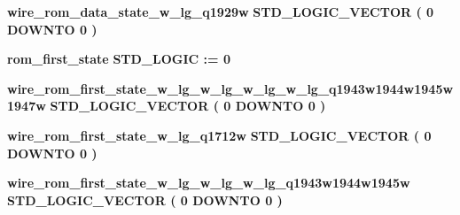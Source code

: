 \begin{DoxyCompactItemize}
\item 
{\bf wire\+\_\+rom\+\_\+data\+\_\+state\+\_\+w\+\_\+lg\+\_\+q1929w} {\bfseries \textcolor{comment}{S\+T\+D\+\_\+\+L\+O\+G\+I\+C\+\_\+\+V\+E\+C\+T\+OR}\textcolor{vhdlchar}{ }\textcolor{vhdlchar}{(}\textcolor{vhdlchar}{ }\textcolor{vhdlchar}{ } \textcolor{vhdldigit}{0} \textcolor{vhdlchar}{ }\textcolor{keywordflow}{D\+O\+W\+N\+TO}\textcolor{vhdlchar}{ }\textcolor{vhdlchar}{ } \textcolor{vhdldigit}{0} \textcolor{vhdlchar}{ }\textcolor{vhdlchar}{)}\textcolor{vhdlchar}{ }} 
\item 
{\bf rom\+\_\+first\+\_\+state} {\bfseries \textcolor{comment}{S\+T\+D\+\_\+\+L\+O\+G\+IC}\textcolor{vhdlchar}{ }\textcolor{vhdlchar}{ }\textcolor{vhdlchar}{\+:}\textcolor{vhdlchar}{=}\textcolor{vhdlchar}{ }\textcolor{vhdlchar}{ }\textcolor{vhdlchar}{\textquotesingle{}}\textcolor{vhdlchar}{ } \textcolor{vhdldigit}{0} \textcolor{vhdlchar}{ }\textcolor{vhdlchar}{\textquotesingle{}}\textcolor{vhdlchar}{ }} 
\item 
{\bf wire\+\_\+rom\+\_\+first\+\_\+state\+\_\+w\+\_\+lg\+\_\+w\+\_\+lg\+\_\+w\+\_\+lg\+\_\+w\+\_\+lg\+\_\+q1943w1944w1945w1947w} {\bfseries \textcolor{comment}{S\+T\+D\+\_\+\+L\+O\+G\+I\+C\+\_\+\+V\+E\+C\+T\+OR}\textcolor{vhdlchar}{ }\textcolor{vhdlchar}{(}\textcolor{vhdlchar}{ }\textcolor{vhdlchar}{ } \textcolor{vhdldigit}{0} \textcolor{vhdlchar}{ }\textcolor{keywordflow}{D\+O\+W\+N\+TO}\textcolor{vhdlchar}{ }\textcolor{vhdlchar}{ } \textcolor{vhdldigit}{0} \textcolor{vhdlchar}{ }\textcolor{vhdlchar}{)}\textcolor{vhdlchar}{ }} 
\item 
{\bf wire\+\_\+rom\+\_\+first\+\_\+state\+\_\+w\+\_\+lg\+\_\+q1712w} {\bfseries \textcolor{comment}{S\+T\+D\+\_\+\+L\+O\+G\+I\+C\+\_\+\+V\+E\+C\+T\+OR}\textcolor{vhdlchar}{ }\textcolor{vhdlchar}{(}\textcolor{vhdlchar}{ }\textcolor{vhdlchar}{ } \textcolor{vhdldigit}{0} \textcolor{vhdlchar}{ }\textcolor{keywordflow}{D\+O\+W\+N\+TO}\textcolor{vhdlchar}{ }\textcolor{vhdlchar}{ } \textcolor{vhdldigit}{0} \textcolor{vhdlchar}{ }\textcolor{vhdlchar}{)}\textcolor{vhdlchar}{ }} 
\item 
{\bf wire\+\_\+rom\+\_\+first\+\_\+state\+\_\+w\+\_\+lg\+\_\+w\+\_\+lg\+\_\+w\+\_\+lg\+\_\+q1943w1944w1945w} {\bfseries \textcolor{comment}{S\+T\+D\+\_\+\+L\+O\+G\+I\+C\+\_\+\+V\+E\+C\+T\+OR}\textcolor{vhdlchar}{ }\textcolor{vhdlchar}{(}\textcolor{vhdlchar}{ }\textcolor{vhdlchar}{ } \textcolor{vhdldigit}{0} \textcolor{vhdlchar}{ }\textcolor{keywordflow}{D\+O\+W\+N\+TO}\textcolor{vhdlchar}{ }\textcolor{vhdlchar}{ } \textcolor{vhdldigit}{0} \textcolor{vhdlchar}{ }\textcolor{vhdlchar}{)}\textcolor{vhdlchar}{ }} 

\end{DoxyCompactItemize}
